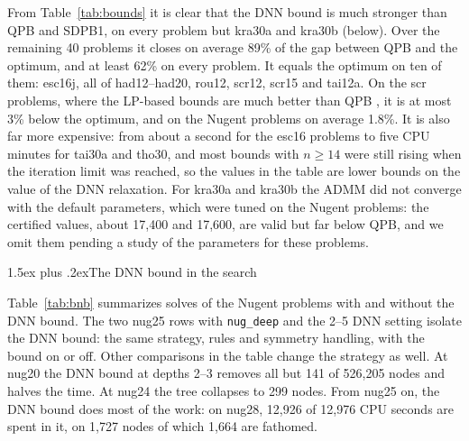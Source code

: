 \documentclass[10pt]{article}
\makeatletter
\renewcommand\subsection{\@startsection{subsection}{2}{\z@}{-3.25ex plus -1ex minus -.2ex}%
  {1.5ex plus .2ex}{\normalfont\normalsize\bfseries}}
\theoremstyle{remark}
\makeatother
\begin{document}
From Table~\ref{tab:bounds} it is clear that the DNN bound is much stronger than
QPB and SDPB1, on every problem but kra30a and kra30b (below). Over the remaining
40 problems it closes on average 89\% of the gap between QPB and the optimum, and at
least 62\% on every problem. It equals the optimum on ten of them: esc16j, all of
had12--had20, rou12, scr12, scr15 and tai12a. On the scr problems, where the
LP-based bounds are much better than QPB \cite{ab01}, it is at most 3\% below the
optimum, and on the Nugent problems on average 1.8\%. It is also far more expensive:
from about a second for the esc16 problems to five CPU minutes for tai30a and
tho30, and most bounds with $n\ge14$ were still rising when the iteration limit
was reached, so the values in the table are lower bounds on the value of the DNN
relaxation. For kra30a and kra30b the ADMM did not converge with the default
parameters, which were tuned on the Nugent problems: the certified values, about
17,400 and 17,600, are valid but far below QPB, and we omit them pending a study of
the parameters for these problems.

\subsection{The DNN bound in the search}

Table~\ref{tab:bnb} summarizes solves of the Nugent problems with and without the
DNN bound. The two nug25 rows with \texttt{nug\_deep} and the 2--5 DNN setting
isolate the DNN bound: the same strategy, rules and symmetry handling, with the
bound on or off. Other comparisons in the table change the strategy as well. At
nug20 the DNN bound at depths 2--3 removes all but 141 of 526,205 nodes and halves
the time. At nug24 the tree collapses to 299 nodes. From nug25 on, the DNN bound does
most of the work: on nug28, 12,926 of 12,976 CPU seconds are spent in it, on 1,727
nodes of which 1,664 are fathomed.
\end{document}
